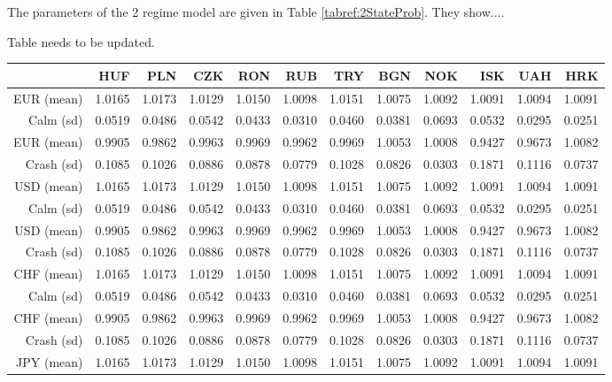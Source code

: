 \documentclass[12pt, a4paper, oneside]{article} %
\begin{document}
The parameters of the 2 regime model are given in Table \ref{tabref:2StateProb}.  They show....

Table needs to be updated. 

\begin{landscape}
\begin{table}[ht]
\centering
\begin{tabular}{rrrrrrrrrrrr}
  \hline
 & HUF & PLN & CZK & RON & RUB & TRY & BGN & NOK & ISK & UAH & HRK \\ 
  \hline
  EUR (mean) & 1.0165 & 1.0173 & 1.0129 & 1.0150 & 1.0098 & 1.0151 & 1.0075 & 1.0092 & 1.0091 & 1.0094 & 1.0091 \\ 
  Calm (sd) & 0.0519 & 0.0486 & 0.0542 & 0.0433 & 0.0310 & 0.0460 & 0.0381 & 0.0693 & 0.0532 & 0.0295 & 0.0251 \\ 
  EUR (mean) & 0.9905 & 0.9862 & 0.9963 & 0.9969 & 0.9962 & 0.9969 & 1.0053 & 1.0008 & 0.9427 & 0.9673 & 1.0082 \\ 
  Crash (sd) & 0.1085 & 0.1026 & 0.0886 & 0.0878 & 0.0779 & 0.1028 & 0.0826 & 0.0303 & 0.1871 & 0.1116 & 0.0737 \\ 
  \hline
  USD (mean) & 1.0165 & 1.0173 & 1.0129 & 1.0150 & 1.0098 & 1.0151 & 1.0075 & 1.0092 & 1.0091 & 1.0094 & 1.0091 \\ 
  Calm (sd) & 0.0519 & 0.0486 & 0.0542 & 0.0433 & 0.0310 & 0.0460 & 0.0381 & 0.0693 & 0.0532 & 0.0295 & 0.0251 \\ 
  USD (mean) & 0.9905 & 0.9862 & 0.9963 & 0.9969 & 0.9962 & 0.9969 & 1.0053 & 1.0008 & 0.9427 & 0.9673 & 1.0082 \\ 
  Crash (sd) & 0.1085 & 0.1026 & 0.0886 & 0.0878 & 0.0779 & 0.1028 & 0.0826 & 0.0303 & 0.1871 & 0.1116 & 0.0737 \\ 
  \hline
  CHF (mean)& 1.0165 & 1.0173 & 1.0129 & 1.0150 & 1.0098 & 1.0151 & 1.0075 & 1.0092 & 1.0091 & 1.0094 & 1.0091 \\ 
  Calm (sd)& 0.0519 & 0.0486 & 0.0542 & 0.0433 & 0.0310 & 0.0460 & 0.0381 & 0.0693 & 0.0532 & 0.0295 & 0.0251 \\ 
  CHF (mean) & 0.9905 & 0.9862 & 0.9963 & 0.9969 & 0.9962 & 0.9969 & 1.0053 & 1.0008 & 0.9427 & 0.9673 & 1.0082 \\ 
  Crash (sd) & 0.1085 & 0.1026 & 0.0886 & 0.0878 & 0.0779 & 0.1028 & 0.0826 & 0.0303 & 0.1871 & 0.1116 & 0.0737 \\ 
  \hline
  JPY (mean) & 1.0165 & 1.0173 & 1.0129 & 1.0150 & 1.0098 & 1.0151 & 1.0075 & 1.0092 & 1.0091 & 1.0094 & 1.0091 \\ 

\end{tabular}
\end{table}
\end{landscape}
\end{document}
